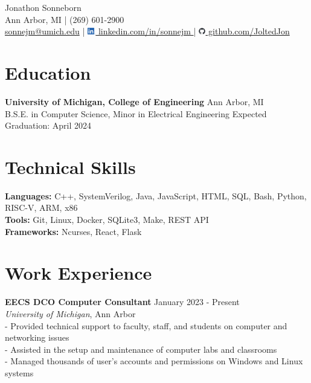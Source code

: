 \documentclass[letterpaper,11pt]{article}
\begin{document}
\begin{center}
  {\Huge Jonathon Sonneborn} \\
  \vspace{2pt}
  Ann Arbor, MI \quad | \quad (269) 601-2900 \\
  \small \href{mailto:sonnejm@umich.edu}{sonnejm@umich.edu} \quad | \quad
  \href{https://www.linkedin.com/in/sonnejm/}{
    \includegraphics[height=0.3cm]{images/LI-In-Bug.png}
    linkedin.com/in/sonnejm
  } \quad | \quad
  \href{https://github.com/joltedjon}{
    \includegraphics[height=0.3cm]{images/github-mark.png}
    github.com/JoltedJon
  } \\
  \vspace{6pt}
\end{center}

\section*{Education}
\textbf{University of Michigan, College of Engineering} \hfill Ann Arbor, MI \\
B.S.E. in Computer Science, Minor in Electrical Engineering \hfill Expected Graduation: April 2024

\section*{Technical Skills}
\textbf{Languages:} C++, SystemVerilog, Java, JavaScript, HTML, SQL, Bash, Python, RISC-V, ARM, x86 \\
\textbf{Tools:} Git, Linux, Docker, SQLite3, Make, REST API \\
\textbf{Frameworks:} Ncurses, React, Flask

\section*{Work Experience}
\textbf{EECS DCO Computer Consultant} \hfill January 2023 - Present \\
\textit{University of Michigan}, Ann Arbor \\
- Provided technical support to faculty, staff, and students on computer and networking issues \\
- Assisted in the setup and maintenance of computer labs and classrooms \\
- Managed thousands of user's accounts and permissions on Windows and Linux systems
\end{document}
